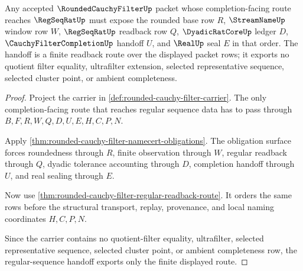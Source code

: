 \begin{theorem}\label{thm:rounded-cauchy-filter-regular-sequence-handoff}
Any accepted $\RoundedCauchyFilterUp$ packet whose completion-facing route reaches $\RegSeqRatUp$ must expose the rounded base row $R$, $\StreamNameUp$ window row $W$, $\RegSeqRatUp$ readback row $Q$, $\DyadicRatCoreUp$ ledger $D$, $\CauchyFilterCompletionUp$ handoff $U$, and $\RealUp$ seal $E$ in that order. The handoff is a finite readback route over the displayed packet rows; it exports no quotient filter equality, ultrafilter extension, selected representative sequence, selected cluster point, or ambient completeness.
\end{theorem}
\begin{proof}
Project the carrier in \autoref{def:rounded-cauchy-filter-carrier}. The only completion-facing route that reaches regular sequence data has to pass through $B,F,R,W,Q,D,U,E,H,C,P,N$.

Apply \autoref{thm:rounded-cauchy-filter-namecert-obligations}. The obligation surface forces roundedness through $R$, finite observation through $W$, regular readback through $Q$, dyadic tolerance accounting through $D$, completion handoff through $U$, and real sealing through $E$.

Now use \autoref{thm:rounded-cauchy-filter-regular-readback-route}. It orders the same rows before the structural transport, replay, provenance, and local naming coordinates $H,C,P,N$.

Since the carrier contains no quotient-filter equality, ultrafilter, selected representative sequence, selected cluster point, or ambient completeness row, the regular-sequence handoff exports only the finite displayed route.
\end{proof}



